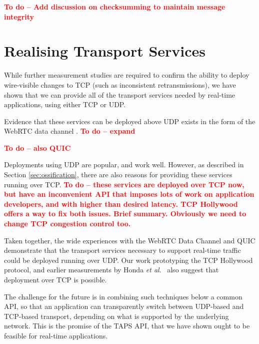 \documentclass{sig-alternate-05-2015}
\newcommand{\todo}[1]{\textbf{\textcolor{red}{To do -- #1}}}
\begin{document}
\todo{Add discussion on checksumming to maintain message integrity}

\section{Realising Transport Services}
\label{sec:realising}

While further measurement studies are required to confirm the ability to
deploy wire-visible changes to TCP (such as inconsistent retransmissions),
we have shown that we can provide all of the transport services needed by
real-time applications, using either TCP or UDP. 

Evidence that these services can be deployed above UDP exists in the form
of the WebRTC data channel \cite{}.  
\todo{expand}

\todo{also QUIC}


Deployments using UDP are popular, and work well. However, as described in
Section \ref{sec:ossification}, there are also reasons for providing these 
services running over TCP. 
\todo{
  these services are deployed over TCP now, but have an inconvenient API that
  imposes lots of work on application developers, and with higher than desired
  latency. 
  TCP Hollywood offers a way to fix both issues.
  Brief summary.
  Obviously we need to change TCP congestion control too.
}

Taken together, the wide experiences with the WebRTC Data Channel and QUIC
demonstrate that the transport services necessary to support real-time
traffic could be deployed running over UDP. Our work prototyping the TCP
Hollywood protocol, and earlier measurements by Honda \emph{et al}.\
\cite{} also suggest that deployment over TCP is possible.

The challenge for the future is in combining such techniques below a common
API, so that an application can transparently switch between UDP-based and
TCP-based transport, depending on what is supported by the underlying
network. This is the promise of the TAPS API, that we have shown ought to
be feasible for real-time applications.

\end{document}
